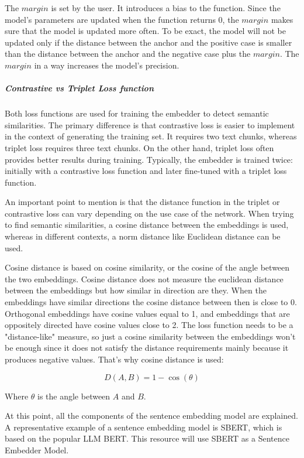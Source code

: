 \documentclass{wseas}
\begin{document}
The \(margin\) is set by the user. It introduces a bias to the function. Since the model's parameters 
are updated when the function returns 0, the \(margin\) makes sure that the model is updated more often. 
To be exact, the model will not be updated only if the distance between the anchor and the positive case is smaller
than the distance between the anchor and the negative case plus the \(margin\). The \(margin\) in a way
increases the model's precision.


\subparagraph{Contrastive vs Triplet Loss function}

Both loss functions are used for training the embedder to detect
semantic similarities. The primary difference is that contrastive loss
is easier to implement in the context of generating the training set. It
requires two text chunks, whereas triplet loss requires three text
chunks. On the other hand, triplet loss often provides better results
during training. Typically, the embedder is trained twice: initially
with a contrastive loss function and later fine-tuned with a triplet
loss function.

An important point to mention is that the distance function in the
triplet or contrastive loss can vary depending on the use case of the
network. When trying to find semantic similarities, a cosine distance
between the embeddings is used, whereas in different contexts, a norm
distance like Euclidean distance can be used.

Cosine distance is based on cosine similarity, or the cosine of the
angle between the two embeddings. Cosine distance does not measure the
euclidean distance between the embeddings but how similar in
direction are they. When the embeddings have similar directions the cosine distance
between then is close to 0. Orthogonal embeddings have cosine values equal to 1, 
and embeddings that are oppositely directed have cosine values close to 2. The loss
function needs to be a "distance-like" measure, so just a cosine similarity
between the embeddings won't be enough since it does not satisfy the
distance requirements mainly because it produces negative values. That's why 
cosine distance is used:

\begin{equation}
  D(A, B) = 1 - \cos(\theta)
\end{equation}

Where \(\theta\) is the angle between \(A\) and \(B\).

At this point, all the components of the sentence embedding model are
explained. A representative example of a sentence embedding model is
SBERT, which is based on the popular LLM BERT. This resource will use
SBERT as a Sentence Embedder Model.
\end{document}
